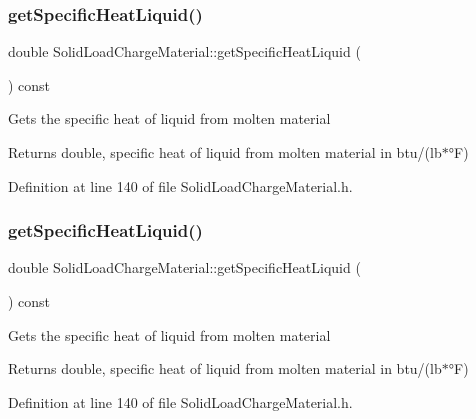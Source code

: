 \subsubsection{\texorpdfstring{get\+Specific\+Heat\+Liquid()}{getSpecificHeatLiquid()}\hspace{0.1cm}{\footnotesize\ttfamily [1/3]}}
{\footnotesize\ttfamily double Solid\+Load\+Charge\+Material\+::get\+Specific\+Heat\+Liquid (\begin{DoxyParamCaption}{ }\end{DoxyParamCaption}) const\hspace{0.3cm}{\ttfamily [inline]}}

Gets the specific heat of liquid from molten material \begin{DoxyReturn}{Returns}
double, specific heat of liquid from molten material in btu/(lb$\ast$°F) 
\end{DoxyReturn}


Definition at line 140 of file Solid\+Load\+Charge\+Material.\+h.

\mbox{\label{class_solid_load_charge_material_a8b02308194b603276df3a894c401e923}} 
\subsubsection{\texorpdfstring{get\+Specific\+Heat\+Liquid()}{getSpecificHeatLiquid()}\hspace{0.1cm}{\footnotesize\ttfamily [2/3]}}
{\footnotesize\ttfamily double Solid\+Load\+Charge\+Material\+::get\+Specific\+Heat\+Liquid (\begin{DoxyParamCaption}{ }\end{DoxyParamCaption}) const\hspace{0.3cm}{\ttfamily [inline]}}

Gets the specific heat of liquid from molten material \begin{DoxyReturn}{Returns}
double, specific heat of liquid from molten material in btu/(lb$\ast$°F) 
\end{DoxyReturn}


Definition at line 140 of file Solid\+Load\+Charge\+Material.\+h.

\mbox{\label{class_solid_load_charge_material_a8b02308194b603276df3a894c401e923}} 
